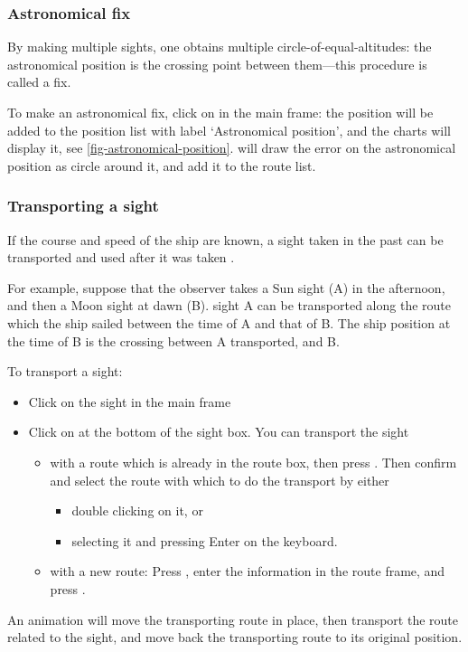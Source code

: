 \documentclass{ol-softwaremanual}
\begin{document}
\subsubsection{Astronomical \gls{fix}}

By making multiple \glspl{sight}, one obtains multiple \glspl{circle-of-equal-altitude}: the astronomical \gls{position} is the crossing point between them---this procedure is called a \gls{fix}. 

To make an astronomical \gls{fix}, click on  in the main frame: the \gls{position} will be added to the \gls{position} list with label `Astronomical \gls{position}', and the charts will display it, see \cref{fig-astronomical-position}. \thel will draw the error on the astronomical \gls{position} as  circle around it, and add it to the \gls{route} list. 




\subsubsection{Transporting a \gls{sight}}\label{section-transporting-sight}

If the course and speed of the ship are known, a \gls{sight} taken in the past can be \gls{transported} and used after it was taken \cite{bowditch2002the,noauthor2017cours}. 

For example, suppose that the observer takes a Sun \gls{sight} (A) in the afternoon, and then a Moon \gls{sight} at dawn (B). \Gls{sight} A can be \gls{transported} along the \gls{route} which the ship sailed between the time of A and that of B. The ship \gls{position} at the time of B is the crossing between A \gls{transported}, and B. 

To transport a sight: 
\begin{itemize}
\item Click on the \gls{sight} in the main frame
\item Click on  at the bottom of the \gls{sight} box. You can transport the \gls{sight}
\begin{itemize}
\item with a \gls{route} which is already in the \gls{route} box, then press . Then confirm and select the \gls{route} with which to do the transport by either
\begin{itemize}
  \item double clicking on it, or
  \item selecting it and pressing Enter on the keyboard. 
\end{itemize}
\item with a new \gls{route}: Press , enter the information in the \gls{route} frame, and press . 
\end{itemize}
\end{itemize}
An animation will move the transporting \gls{route} in place, then transport the \gls{route} related to the \gls{sight}, and move back the transporting \gls{route} to its original \gls{position}. 
\end{document}
